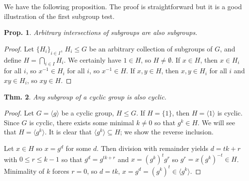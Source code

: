 \documentclass[12pt, a4paper]{book}
\newtheorem{theorem}{Thm.}[section]
\newtheorem{proposition}[theorem]{Prop.}
\theoremstyle{nonumberplain}
\newtheorem{proof}{Proof}
\begin{document}
We have the following proposition.
The proof is straightforward but it is a good illustration of the first subgroup test.
\begin{proposition}
    Arbitrary intersections of subgroups are also subgroups.
\end{proposition}
\begin{proof}
    Let $\{H_i\}_{i\in I}$, $H_i\leq G$ be an arbitrary collection of subgroups of $G$, and define $H=\bigcap\limits_{i\in I}H_i$.
    We certainly have $1\in H$, so $H\neq\emptyset$.
    If $x\in H$, then $x\in H_i$ for all $i$, so $x^{-1}\in H_i$ for all $i$, so $x^{-1}\in H$.
    If $x,y\in H$, then $x,y\in H_i$ for all $i$ and $xy\in H_i$, so $xy\in H$.
\end{proof}
\begin{theorem}
    Any subgroup of a cyclic group is also cyclic.
\end{theorem}
\begin{proof}
    Let $G=\langle g\rangle$ be a cyclic group, $H\leq G$.
    If $H=\{1\}$, then $H=\langle 1\rangle$ is cyclic.
    Since $G$ is cyclic, there exists some minimal $k\neq 0$ so that $g^k\in H$.
    We will see that $H=\langle g^k\rangle$.
    It is clear that $\langle g^k\rangle \subseteq H$; we show the reverse inclusion.

    Let $x\in H$ so $x=g^d$ for some $d$.
    Then division with remainder yields $d=tk+r$ with $0\leq r\leq k-1$ so that
    $g^d=g^{tk+r}$ and $x=(g^k)^tg^r$ so $g^r=x(g^k)^{-t}\in H$.
    Minimality of $k$ forces $r=0$, so $d=tk$, $x=g^d=(g^k)^t\in\langle g^k\rangle$.
\end{proof}
\end{document}
